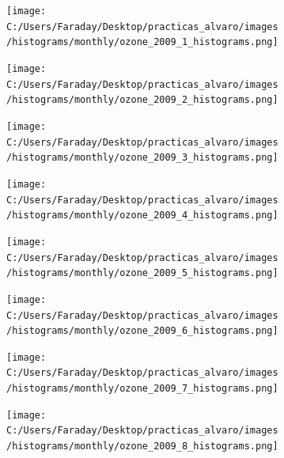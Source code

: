 \documentclass[12pt]{article}
\begin{document}
\newpage

\begin{figure}[H]
\centering
\begin{subfigure}[h]{0.45\textwidth}
\texttt{[image: C:/Users/Faraday/Desktop/practicas\_alvaro/images/histograms/monthly/ozone\_2009\_1\_histograms.png]}
\caption{}
\label{fig:hist-mon-2-1-2009}
\end{subfigure}
%
\begin{subfigure}[H]{0.45\textwidth}
\texttt{[image: C:/Users/Faraday/Desktop/practicas\_alvaro/images/histograms/monthly/ozone\_2009\_2\_histograms.png]}
\caption{}
\label{fig:hist-mon-2-2-2009}
\end{subfigure}
\caption{}
\end{figure}

\begin{figure}[H]
\centering
\begin{subfigure}[h]{0.45\textwidth}
\texttt{[image: C:/Users/Faraday/Desktop/practicas\_alvaro/images/histograms/monthly/ozone\_2009\_3\_histograms.png]}
\caption{}
\label{fig:hist-mon-2-3-2009}
\end{subfigure}
%
\begin{subfigure}[H]{0.45\textwidth}
\texttt{[image: C:/Users/Faraday/Desktop/practicas\_alvaro/images/histograms/monthly/ozone\_2009\_4\_histograms.png]}
\caption{}
\label{fig:hist-mon-2-4-2009}
\end{subfigure}
\caption{}
\end{figure}

\begin{figure}[H]
\centering
\begin{subfigure}[h]{0.45\textwidth}
\texttt{[image: C:/Users/Faraday/Desktop/practicas\_alvaro/images/histograms/monthly/ozone\_2009\_5\_histograms.png]}
\caption{}
\label{fig:hist-mon-2-5-2009}
\end{subfigure}
%
\begin{subfigure}[H]{0.45\textwidth}
\texttt{[image: C:/Users/Faraday/Desktop/practicas\_alvaro/images/histograms/monthly/ozone\_2009\_6\_histograms.png]}
\caption{}
\label{fig:hist-mon-2-6-2009}
\end{subfigure}
\caption{}
\end{figure}

\newpage

\begin{figure}[H]
\centering
\begin{subfigure}[h]{0.45\textwidth}
\texttt{[image: C:/Users/Faraday/Desktop/practicas\_alvaro/images/histograms/monthly/ozone\_2009\_7\_histograms.png]}
\caption{}
\label{fig:hist-mon-2-7-2009}
\end{subfigure}
%
\begin{subfigure}[H]{0.45\textwidth}
\texttt{[image: C:/Users/Faraday/Desktop/practicas\_alvaro/images/histograms/monthly/ozone\_2009\_8\_histograms.png]}
\caption{}
\label{fig:hist-mon-2-8-2009}
\end{subfigure}
\caption{}
\end{figure}
\end{document}
